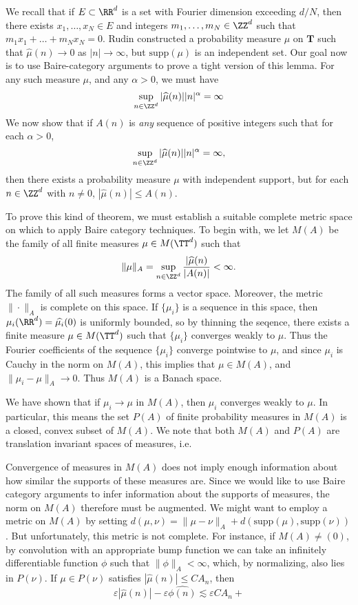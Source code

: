 We recall that if $E \subset \RR^d$ is a set with Fourier dimension exceeding $d/N$, then there exists $x_1, \dots, x_N \in E$ and integers $m_1, \dots, m_N \in \ZZ^d$ such that $m_1 x_1 + \dots + m_N x_N = 0$. Rudin constructed a probability measure $\mu$ on $\mathbf{T}$ such that $\widehat{\mu}(n) \to 0$ as $|n| \to \infty$, but $\text{supp}(\mu)$ is an independent set. Our goal now is to use Baire-category arguments to prove a tight version of this lemma. For any such measure $\mu$, and any $\alpha > 0$, we must have
%
\[ \sup_{n \in \ZZ^d} |\widehat{\mu}(n)| |n|^\alpha = \infty \]
%
We now show that if $A(n)$ is \emph{any} sequence of positive integers such that for each $\alpha > 0$,
%
\[ \sup_{n \in \ZZ^d} |\widehat{\mu}(n)| |n|^\alpha = \infty, \]
%
then there exists a probability measure $\mu$ with independent support, but for each $n \in \ZZ^d$ with $n \neq 0$, $|\widehat{\mu}(n)| \leq A(n)$. 

To prove this kind of theorem, we must establish a suitable complete metric space on which to apply Baire category techniques. To begin with, we let $M(A)$ be the family of all finite measures $\mu \in M(\TT^d)$ such that
%
\[ \| \mu \|_A = \sup_{n \in \ZZ^d} \frac{|\widehat{\mu}(n)}{|A(n)|} < \infty. \]
%
The family of all such measures forms a vector space. Moreover, the metric $\| \cdot \|_A$ is complete on this space. If $\{ \mu_i \}$ is a sequence in this space, then $\mu_i(\RR^d) = \widehat{\mu_i}(0)$ is uniformly bounded, so by thinning the seqence, there exists a finite measure $\mu \in M(\TT^d)$ such that $\{ \mu_i \}$ converges weakly to $\mu$. Thus the Fourier coefficients of the sequence $\{ \mu_i \}$ converge pointwise to $\mu$, and since $\mu_i$ is Cauchy in the norm on $M(A)$, this implies that $\mu \in M(A)$, and $\| \mu_i - \mu \|_A \to 0$. Thus $M(A)$ is a Banach space.

\begin{remark}
	We have shown that if $\mu_i \to \mu$ in $M(A)$, then $\mu_i$ converges weakly to $\mu$. In particular, this means the set $P(A)$ of finite probability measures in $M(A)$ is a closed, convex subset of $M(A)$. We note that both $M(A)$ and $P(A)$ are translation invariant spaces of measures, i.e. 
\end{remark}

Convergence of measures in $M(A)$ does not imply enough information about how similar the supports of these measures are. Since we would like to use Baire category arguments to infer information about the supports of measures, the norm on $M(A)$ therefore must be augmented. We might want to employ a metric on $M(A)$ by setting $d(\mu,\nu) = \| \mu - \nu \|_A + d(\text{supp}(\mu), \text{supp}(\nu))$. But unfortunately, this metric is not complete. For instance, if $M(A) \neq (0)$, by convolution with an appropriate bump function we can take an infinitely differentiable function $\phi$ such that $\| \phi \|_A < \infty$, which, by normalizing, also lies in $P(\nu)$. If $\mu \in P(\nu)$ satisfies $|\widehat{\mu}(n)| \leq C A_n$, then
%
\[ \varepsilon |\widehat{\mu}(n)| - \varepsilon \widehat{\phi(n)} \lesssim \varepsilon C A_n +  \]
%


